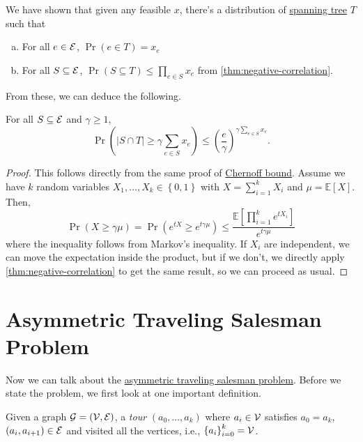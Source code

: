 \begin{prev}
	We have shown that given any feasible \(x\), there's a distribution of \hyperref[def:spanning-tree]{spanning tree} \(T\) such that
	\begin{enumerate}[(a)]
		\item For all \(e\in \mathcal{\MakeUppercase{e}} \), \(\Pr(e\in T) = x_e\)
		\item For all \(S \subseteq \mathcal{\MakeUppercase{e}} \), \(\Pr(S \subseteq T) \leq \prod_{e\in S} x_e\) from \autoref{thm:negative-correlation}.
	\end{enumerate}
\end{prev}

From these, we can deduce the following.
\begin{theorem}\label{thm:lec11}
	For all \(S \subseteq \mathcal{\MakeUppercase{e}} \) and \(\gamma \geq 1\),
	\[
		\Pr(\left\vert S \cap T \right\vert \geq \gamma \sum_{e\in S} x_e) \leq \left( \frac{e}{\gamma } \right) ^{\gamma \sum_{e\in S} x_e}.
	\]
\end{theorem}
\begin{proof}
	This follows directly from the same proof of \href{https://en.wikipedia.org/wiki/Chernoff_bound}{Chernoff bound}. Assume we have \(k\) random variables \(X_1, \ldots, X_k \in \left\{ 0, 1 \right\} \) with \(X = \sum_{i=1} ^k X_i\) and \(\mu = \mathbb{E}\left[X \right]\). Then,
	\[
		\Pr(X \geq \gamma \mu )= \Pr(e^{tX} \geq e^{t \gamma \mu }) \leq \frac{\mathbb{E}\left[\prod_{i=1}^{k} e^{tX_i} \right] }{e^{t \gamma \mu }}
	\]
	where the inequality follows from Markov's inequality. If \(X_i\) are independent, we can move the expectation inside the product, but if we don't, we directly apply \autoref{thm:negative-correlation} to get the same result, so we can proceed as usual.
\end{proof}

\section{Asymmetric Traveling Salesman Problem}

Now we can talk about the \hyperref[prb:ATSP]{asymmetric traveling salesman problem}. Before we state the problem, we first look at one important definition.

\begin{definition}[Tour]\label{def:tour}
	Given a graph \(\mathcal{\MakeUppercase{g}} =(\mathcal{\MakeUppercase{v}} , \mathcal{\MakeUppercase{e}} )\), a \emph{tour} \((a_0, \ldots , a_k)\) where \(a_i\in \mathcal{\MakeUppercase{v}} \) satisfies \(a_0 = a_k\), \((a_i, a_{i+1})\in \mathcal{\MakeUppercase{e}} \) and visited all the vertices, i.e., \(\left\{ a_i \right\} _{i=0}^k = \mathcal{\MakeUppercase{v}} \).
\end{definition}

